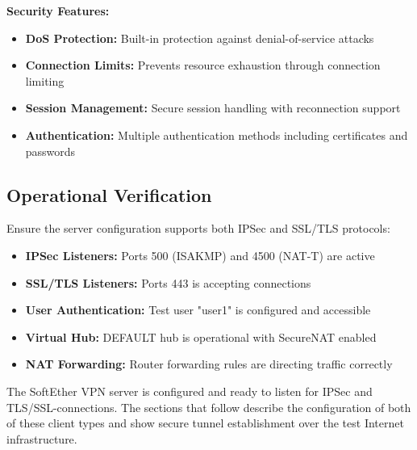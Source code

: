 \noindent
\textbf{Security Features:}

\begin{itemize}
    \item \textbf{DoS Protection:} Built-in protection against denial-of-service attacks
    \item \textbf{Connection Limits:} Prevents resource exhaustion through connection limiting
    \item \textbf{Session Management:} Secure session handling with reconnection support
    \item \textbf{Authentication:} Multiple authentication methods including certificates and passwords
\end{itemize}

\subsection{Operational Verification}

Ensure the server configuration supports both IPSec and SSL/TLS protocols:

\begin{itemize}
    \item \textbf{IPSec Listeners:} Ports 500 (ISAKMP) and 4500 (NAT-T) are active
    \item \textbf{SSL/TLS Listeners:} Ports 443 is accepting connections 
    \item \textbf{User Authentication:} Test user "user1" is configured and accessible
    \item \textbf{Virtual Hub:} DEFAULT hub is operational with SecureNAT enabled
    \item \textbf{NAT Forwarding:} Router forwarding rules are directing traffic correctly
\end{itemize}

The SoftEther VPN server is configured and ready to listen for IPSec and TLS/SSL-connections. The sections that follow describe the configuration of both of these client types and show secure tunnel establishment over the test Internet infrastructure.
